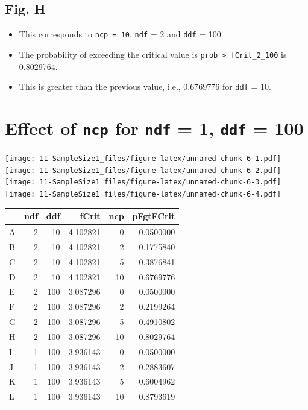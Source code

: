 \documentclass[]{book}
\providecommand{\tightlist}{%
  \setlength{\itemsep}{0pt}\setlength{\parskip}{0pt}}
\begin{document}
\hypertarget{fig.-h}{%
\subsection{Fig. H}\label{fig.-h}}

\begin{itemize}
\tightlist
\item
  This corresponds to \texttt{ncp\ =\ 10}, \texttt{ndf} = 2 and \texttt{ddf} = 100.
\item
  The probability of exceeding the critical value is \texttt{prob\ \textgreater{}\ fCrit\_2\_100} is 0.8029764.
\item
  This is greater than the previous value, i.e., 0.6769776 for \texttt{ddf} = 10.
\end{itemize}

\hypertarget{effect-of-ncp-for-ndf-1-ddf-100}{%
\section{\texorpdfstring{Effect of \texttt{ncp} for \texttt{ndf} = 1, \texttt{ddf} = 100}{Effect of ncp for ndf = 1, ddf = 100}}\label{effect-of-ncp-for-ndf-1-ddf-100}}

\texttt{[image: 11-SampleSize1\_files/figure-latex/unnamed-chunk-6-1.pdf]} \texttt{[image: 11-SampleSize1\_files/figure-latex/unnamed-chunk-6-2.pdf]} \texttt{[image: 11-SampleSize1\_files/figure-latex/unnamed-chunk-6-3.pdf]} \texttt{[image: 11-SampleSize1\_files/figure-latex/unnamed-chunk-6-4.pdf]}

\begin{tabular}{l|r|r|r|r|r}
\hline
  & ndf & ddf & fCrit & ncp & pFgtFCrit\\
\hline
A & 2 & 10 & 4.102821 & 0 & 0.0500000\\
\hline
B & 2 & 10 & 4.102821 & 2 & 0.1775840\\
\hline
C & 2 & 10 & 4.102821 & 5 & 0.3876841\\
\hline
D & 2 & 10 & 4.102821 & 10 & 0.6769776\\
\hline
E & 2 & 100 & 3.087296 & 0 & 0.0500000\\
\hline
F & 2 & 100 & 3.087296 & 2 & 0.2199264\\
\hline
G & 2 & 100 & 3.087296 & 5 & 0.4910802\\
\hline
H & 2 & 100 & 3.087296 & 10 & 0.8029764\\
\hline
I & 1 & 100 & 3.936143 & 0 & 0.0500000\\
\hline
J & 1 & 100 & 3.936143 & 2 & 0.2883607\\
\hline
K & 1 & 100 & 3.936143 & 5 & 0.6004962\\
\hline
L & 1 & 100 & 3.936143 & 10 & 0.8793619\\
\hline
\end{tabular}
\end{document}
